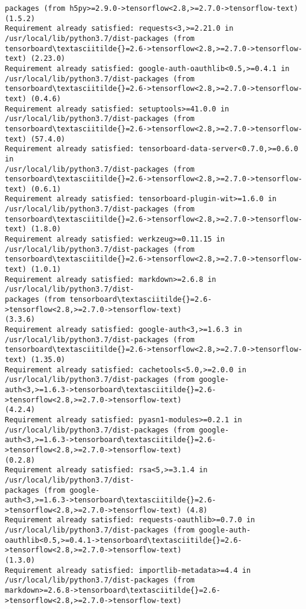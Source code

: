 \documentclass[11pt]{article}
\begin{document}
\begin{Verbatim}[commandchars=\\\{\}]
packages (from h5py>=2.9.0->tensorflow<2.8,>=2.7.0->tensorflow-text) (1.5.2)
Requirement already satisfied: requests<3,>=2.21.0 in
/usr/local/lib/python3.7/dist-packages (from
tensorboard\textasciitilde{}=2.6->tensorflow<2.8,>=2.7.0->tensorflow-text) (2.23.0)
Requirement already satisfied: google-auth-oauthlib<0.5,>=0.4.1 in
/usr/local/lib/python3.7/dist-packages (from
tensorboard\textasciitilde{}=2.6->tensorflow<2.8,>=2.7.0->tensorflow-text) (0.4.6)
Requirement already satisfied: setuptools>=41.0.0 in
/usr/local/lib/python3.7/dist-packages (from
tensorboard\textasciitilde{}=2.6->tensorflow<2.8,>=2.7.0->tensorflow-text) (57.4.0)
Requirement already satisfied: tensorboard-data-server<0.7.0,>=0.6.0 in
/usr/local/lib/python3.7/dist-packages (from
tensorboard\textasciitilde{}=2.6->tensorflow<2.8,>=2.7.0->tensorflow-text) (0.6.1)
Requirement already satisfied: tensorboard-plugin-wit>=1.6.0 in
/usr/local/lib/python3.7/dist-packages (from
tensorboard\textasciitilde{}=2.6->tensorflow<2.8,>=2.7.0->tensorflow-text) (1.8.0)
Requirement already satisfied: werkzeug>=0.11.15 in
/usr/local/lib/python3.7/dist-packages (from
tensorboard\textasciitilde{}=2.6->tensorflow<2.8,>=2.7.0->tensorflow-text) (1.0.1)
Requirement already satisfied: markdown>=2.6.8 in /usr/local/lib/python3.7/dist-
packages (from tensorboard\textasciitilde{}=2.6->tensorflow<2.8,>=2.7.0->tensorflow-text)
(3.3.6)
Requirement already satisfied: google-auth<3,>=1.6.3 in
/usr/local/lib/python3.7/dist-packages (from
tensorboard\textasciitilde{}=2.6->tensorflow<2.8,>=2.7.0->tensorflow-text) (1.35.0)
Requirement already satisfied: cachetools<5.0,>=2.0.0 in
/usr/local/lib/python3.7/dist-packages (from google-
auth<3,>=1.6.3->tensorboard\textasciitilde{}=2.6->tensorflow<2.8,>=2.7.0->tensorflow-text)
(4.2.4)
Requirement already satisfied: pyasn1-modules>=0.2.1 in
/usr/local/lib/python3.7/dist-packages (from google-
auth<3,>=1.6.3->tensorboard\textasciitilde{}=2.6->tensorflow<2.8,>=2.7.0->tensorflow-text)
(0.2.8)
Requirement already satisfied: rsa<5,>=3.1.4 in /usr/local/lib/python3.7/dist-
packages (from google-
auth<3,>=1.6.3->tensorboard\textasciitilde{}=2.6->tensorflow<2.8,>=2.7.0->tensorflow-text) (4.8)
Requirement already satisfied: requests-oauthlib>=0.7.0 in
/usr/local/lib/python3.7/dist-packages (from google-auth-
oauthlib<0.5,>=0.4.1->tensorboard\textasciitilde{}=2.6->tensorflow<2.8,>=2.7.0->tensorflow-text)
(1.3.0)
Requirement already satisfied: importlib-metadata>=4.4 in
/usr/local/lib/python3.7/dist-packages (from
markdown>=2.6.8->tensorboard\textasciitilde{}=2.6->tensorflow<2.8,>=2.7.0->tensorflow-text)

\end{Verbatim}
\end{document}
